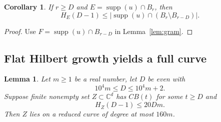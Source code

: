 \documentclass[11pt,reqno]{amsart}
\newcommand\C{\ensuremath{\mathbb{C}}}
\newcommand{\supp}{\operatorname{supp}}
\newtheorem{corollary}[theorem]{Corollary}
\newtheorem{lemma}[theorem]{Lemma}
\theoremstyle{definition}
\theoremstyle{plain}
\numberwithin{equation}{section}
\begin{document}
\begin{corollary}\label{crc:gram}
    If $r\ge D$ and $E=\supp (u)\cap B_r$, then
    \begin{equation*}
        H_{E}(D-1)\le |\supp(u)\cap (B_r\setminus B_{r-D})|.
    \end{equation*}
\end{corollary}
\begin{proof}
    Use $F=\supp(u)\cap B_{r-D}$ in Lemma~\ref{lem:gram}.
\end{proof}

\subsection{Flat Hilbert growth yields a full curve}



\begin{lemma}\label{lem:carrier}
    Let $m\ge 1$ be a real number, let $D$ be even with 
    \begin{equation*}
        10^4 m \le D\le 10^4 m +2.
    \end{equation*}
    Suppose finite nonempty set $Z\subset \C^d$ has $CB(t)$ for some $t\ge D$ and
    \begin{equation*}
        H_Z(D-1)\le 20 Dm.
    \end{equation*}
    Then $Z$ lies on a reduced curve of degree at most $160m$.
\end{lemma}
\end{document}
